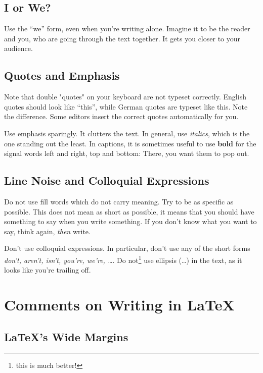 \documentclass[8pt, %
a5paper, %
twoside, %
openright, %
abstract=off, %
DIV=11,      %
BCOR=8mm]{scrbook} %
\begin{document}
    \section{I or We?}

    Use the ``we'' form, even when  you're writing alone.  Imagine it to be
    the reader and  you, who are going through the  text together.  It gets
    you closer to your audience.

    \section{Quotes and Emphasis}
    Note that double "quotes" on  your keyboard are not typeset correctly. 
    English  quotes should  look like  ``this'', while  German quotes  are 
    typeset  like \glqq this\grqq.   Note the  difference.  Some  editors 
    insert the correct quotes automatically for you.                       

    Use  emphasis  sparingly.  It  clutters  the  text.  In  general,  use 
    \emph{italics}, which is the one standing out the least.  In captions, 
    it is sometimes useful to use  \textbf{bold} for the signal words left 
    and right, top and bottom: There, you want them to pop out.

    \section{Line Noise and Colloquial Expressions}

    Do  not use  fill words  which do  not carry  meaning.  Try  to be  as 
    specific as  possible.  This does  not mean  as short as  possible, it 
    means that you should have something to say when you write something.
    If you don't know what you want to say, think again, \emph{then} write.

    Don't use colloquial expressions.  In particular, don't use any of the 
    short forms  \emph{don't, aren't,  isn't, you're, we're,  \ldots}.  Do 
    not\footnote{this is much better!} use  ellipsis (\ldots) in the text, 
    as it looks like you're trailing off.                                  

    \chapter{Comments on Writing in LaTeX}

    \section{\LaTeX{}'s Wide Margins}
\end{document}
